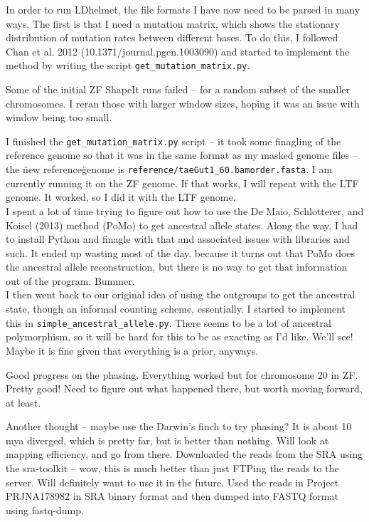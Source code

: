 \documentclass[idxtotoc,hyperref,openany,oneside]{labbook} %
\begin{document}
In order to run LDhelmet, the file formats I have now need to be parsed in many ways. The first is that I need a mutation matrix, which shows the stationary distribution of mutation rates between different bases. To do this, I followed Chan et al. 2012 (10.1371/journal.pgen.1003090) and started to implement the method by writing the script \texttt{get\_mutation\_matrix.py}. 



Some of the initial ZF ShapeIt runs failed -- for a random subset of the smaller chromosomes. I reran those with larger window sizes, hoping it was an issue with window being too small. 

I finished the \texttt{get\_mutation\_matrix.py} script -- it took some finagling of the reference genome so that it was in the same format as my masked genome files -- the \"new reference\" genome is \texttt{reference/taeGut1\_60.bamorder.fasta}. I am currently running it on the ZF genome. If that works, I will repeat with the LTF genome. It worked, so I did it with the LTF genome. \\

I spent a lot of time trying to figure out how to use the De Maio, Schlotterer, and Koisel (2013) method (PoMo) to get ancestral allele states. Along the way, I had to install Python and finagle with that and associated issues with libraries and such. It ended up wasting most of the day, because it turns out that PoMo does the ancestral allele reconstruction, but there is no way to get that information out of the program. Bummer. \\

I then went back to our original idea of using the outgroups to get the ancestral state, though an informal counting scheme, essentially. I started to implement this in \texttt{simple\_ancestral\_allele.py}. There seems to be a lot of ancestral polymorphism, so it will be hard for this to be as exacting as I'd like. We'll see! Maybe it is fine given that everything is a prior, anyways.


Good progress on the phasing. Everything worked but for chromosome 20 in ZF. Pretty good! Need to figure out what happened there, but worth moving forward, at least.

Another thought -- maybe use the Darwin's finch to try phasing? It is about 10 mya diverged, which is pretty far, but is better than nothing. Will look at mapping efficiency, and go from there. Downloaded the reads from the SRA using the sra-toolkit -- wow, this is much better than just FTPing the reads to the server. Will definitely want to use it in the future. Used the reads in Project PRJNA178982 in SRA binary format and then dumped into FASTQ format using fastq-dump. \\
\end{document}

